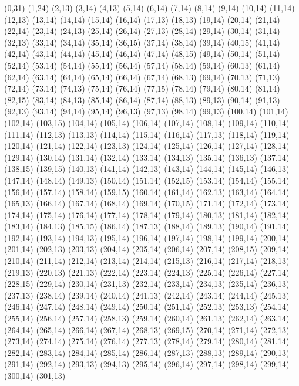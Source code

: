 (0,31)
(1,24)
(2,13)
(3,14)
(4,13)
(5,14)
(6,14)
(7,14)
(8,14)
(9,14)
(10,14)
(11,14)
(12,13)
(13,14)
(14,14)
(15,14)
(16,14)
(17,13)
(18,13)
(19,14)
(20,14)
(21,14)
(22,14)
(23,14)
(24,13)
(25,14)
(26,14)
(27,13)
(28,14)
(29,14)
(30,14)
(31,14)
(32,13)
(33,14)
(34,14)
(35,14)
(36,15)
(37,14)
(38,14)
(39,14)
(40,15)
(41,14)
(42,14)
(43,14)
(44,14)
(45,14)
(46,14)
(47,14)
(48,15)
(49,14)
(50,14)
(51,14)
(52,14)
(53,14)
(54,14)
(55,14)
(56,14)
(57,14)
(58,14)
(59,14)
(60,13)
(61,14)
(62,14)
(63,14)
(64,14)
(65,14)
(66,14)
(67,14)
(68,13)
(69,14)
(70,13)
(71,13)
(72,14)
(73,14)
(74,13)
(75,14)
(76,14)
(77,15)
(78,14)
(79,14)
(80,14)
(81,14)
(82,15)
(83,14)
(84,13)
(85,14)
(86,14)
(87,14)
(88,13)
(89,13)
(90,14)
(91,13)
(92,13)
(93,14)
(94,14)
(95,14)
(96,13)
(97,13)
(98,14)
(99,13)
(100,14)
(101,14)
(102,14)
(103,15)
(104,14)
(105,14)
(106,14)
(107,14)
(108,14)
(109,14)
(110,14)
(111,14)
(112,13)
(113,13)
(114,14)
(115,14)
(116,14)
(117,13)
(118,14)
(119,14)
(120,14)
(121,14)
(122,14)
(123,13)
(124,14)
(125,14)
(126,14)
(127,14)
(128,14)
(129,14)
(130,14)
(131,14)
(132,14)
(133,14)
(134,13)
(135,14)
(136,13)
(137,14)
(138,15)
(139,15)
(140,13)
(141,14)
(142,13)
(143,14)
(144,14)
(145,14)
(146,13)
(147,14)
(148,14)
(149,13)
(150,14)
(151,14)
(152,15)
(153,14)
(154,14)
(155,14)
(156,14)
(157,14)
(158,14)
(159,15)
(160,14)
(161,14)
(162,13)
(163,14)
(164,14)
(165,13)
(166,14)
(167,14)
(168,14)
(169,14)
(170,15)
(171,14)
(172,14)
(173,14)
(174,14)
(175,14)
(176,14)
(177,14)
(178,14)
(179,14)
(180,13)
(181,14)
(182,14)
(183,14)
(184,13)
(185,15)
(186,14)
(187,13)
(188,14)
(189,13)
(190,14)
(191,14)
(192,14)
(193,14)
(194,13)
(195,14)
(196,14)
(197,14)
(198,14)
(199,14)
(200,14)
(201,14)
(202,13)
(203,13)
(204,14)
(205,14)
(206,14)
(207,14)
(208,15)
(209,14)
(210,14)
(211,14)
(212,14)
(213,14)
(214,14)
(215,13)
(216,14)
(217,14)
(218,13)
(219,13)
(220,13)
(221,13)
(222,14)
(223,14)
(224,13)
(225,14)
(226,14)
(227,14)
(228,15)
(229,14)
(230,14)
(231,13)
(232,14)
(233,14)
(234,13)
(235,14)
(236,13)
(237,13)
(238,14)
(239,14)
(240,14)
(241,13)
(242,14)
(243,14)
(244,14)
(245,13)
(246,14)
(247,14)
(248,14)
(249,14)
(250,14)
(251,14)
(252,13)
(253,13)
(254,14)
(255,14)
(256,14)
(257,14)
(258,13)
(259,14)
(260,14)
(261,13)
(262,14)
(263,14)
(264,14)
(265,14)
(266,14)
(267,14)
(268,13)
(269,15)
(270,14)
(271,14)
(272,13)
(273,14)
(274,14)
(275,14)
(276,14)
(277,13)
(278,14)
(279,14)
(280,14)
(281,14)
(282,14)
(283,14)
(284,14)
(285,14)
(286,14)
(287,13)
(288,13)
(289,14)
(290,13)
(291,14)
(292,14)
(293,13)
(294,13)
(295,14)
(296,14)
(297,14)
(298,14)
(299,14)
(300,14)
(301,13)
